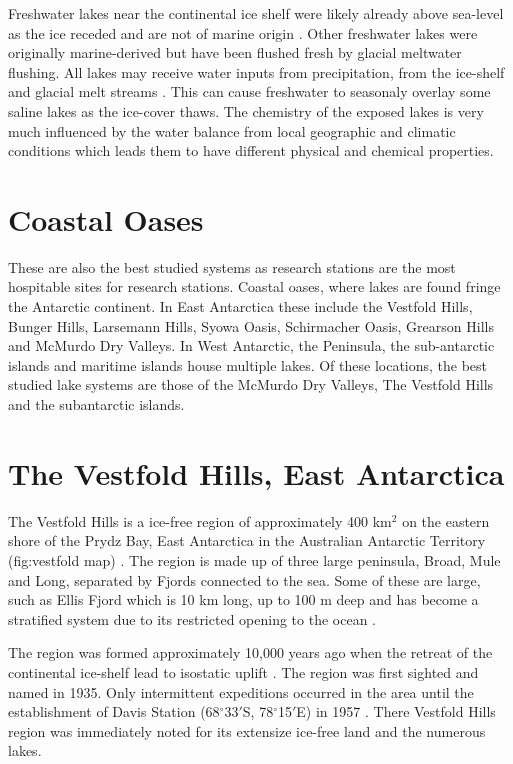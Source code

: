 Freshwater lakes near the continental ice shelf were likely already above sea-level as the ice receded and are not of marine origin \cite{Laybourne-Parry1992} \cite{Bronge1996}.
Other freshwater lakes were originally marine-derived but have been flushed fresh by glacial meltwater flushing\cite{Pickard1986}\cite{Bird1991}.
All lakes may receive water inputs from precipitation, from the ice-shelf and glacial melt streams \cite{Burton1981}. 
This can cause freshwater to seasonaly overlay some saline lakes as the ice-cover thaws.
The chemistry of the exposed lakes is very much influenced by the water balance from local geographic and climatic conditions which leads them to have different physical and chemical properties.

\section{Coastal Oases}
These are also the best studied systems as research stations are the most hospitable sites for research stations.
Coastal oases, where lakes are found fringe the Antarctic continent.
In East Antarctica these include the Vestfold Hills, Bunger Hills, Larsemann Hills, Syowa Oasis, Schirmacher Oasis, Grearson Hills and McMurdo Dry Valleys.
In West Antarctic, the Peninsula, the sub-antarctic islands and maritime islands house multiple lakes. 
Of these locations, the best studied lake systems are those of the McMurdo Dry Valleys, The Vestfold Hills and the subantarctic islands.


\section{The Vestfold Hills, East Antarctica}
The Vestfold Hills is a ice-free region of approximately 400 km$^2$ on the eastern shore of the Prydz Bay, East Antarctica in the Australian Antarctic Territory (fig:vestfold map) \cite{Gibson1999}.
The region is made up of three large peninsula, Broad, Mule and Long, separated by Fjords connected to the sea.
Some of these are large, such as Ellis Fjord which is 10 km long, up to 100 m deep and has become a stratified system due to its restricted opening to the ocean \cite{Burke1988}.

The region was formed approximately 10,000 years ago when the retreat of the continental ice-shelf lead to isostatic uplift \cite{Burton1981}. %
The region was first sighted and named in 1935\cite{Law1959}.
Only intermittent expeditions occurred in the area until the establishment of Davis Station (68$^{\circ}$33$'$S, 78$^{\circ}$15$'$E) in 1957 \cite {Law1959}. 
There Vestfold Hills region was immediately noted for its extensize ice-free land and the numerous lakes\cite{Johnstone1973}.

